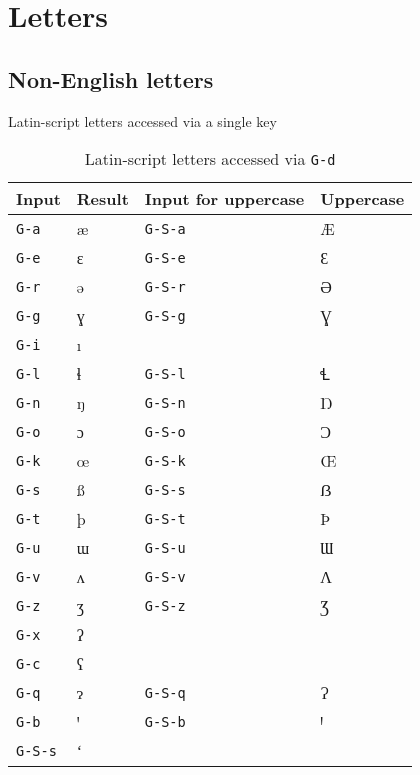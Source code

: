 \documentclass[oneside]{memoir}
\newcommand{\key}{\verb}
\begin{document}
\section{Letters}
\label{sec:letters}

\subsection{Non-English letters}
\label{sec:non-eng_letters}

\begin{table}
\centering
\begin{minipage}{0.4\linewidth}
\centering
\caption{Latin-script letters accessed via a single key}
\label{tab:single_key}
\begin{tabular}{llll}
\toprule
Input & Result & Input for uppercase & Uppercase \\
\midrule
\key|G-a| & æ & \key|G-S-a| & Æ \\
\key|G-e| & ɛ & \key|G-S-e| & Ɛ \\
\key|G-r| & ə & \key|G-S-r| & Ə \\
\key|G-g| & ɣ & \key|G-S-g| & Ɣ \\
\key|G-i| & ı &             &  \\
\key|G-l| & ɬ & \key|G-S-l| & Ɬ \\
\key|G-n| & ŋ & \key|G-S-n| & Ŋ \\
\key|G-o| & ɔ & \key|G-S-o| & Ɔ \\
\key|G-k| & œ & \key|G-S-k| & Œ \\
\key|G-s| & ß & \key|G-S-s| & ẞ \\
\key|G-t| & þ & \key|G-S-t| & Þ \\
\key|G-u| & ɯ & \key|G-S-u| & Ɯ \\
\key|G-v| & ʌ & \key|G-S-v| & Ʌ \\
\key|G-z| & ʒ & \key|G-S-z| & Ʒ \\
\key|G-x| & ʔ &             &  \\
\key|G-c| & ʕ &             &  \\
\key|G-q| & ɂ & \key|G-S-q| & Ɂ \\
\key|G-b| & ꞌ & \key|G-S-b| & Ꞌ \\
\key|G-S-s| & ʻ &             &  \\
\bottomrule
\end{tabular}
\end{minipage}\hfill
\begin{minipage}{0.4\linewidth}
\centering
\cprotect\caption{Latin-script letters accessed via \key|G-d|}
\label{tab:letters_g-d}

\end{minipage}
\end{table}
\end{document}
